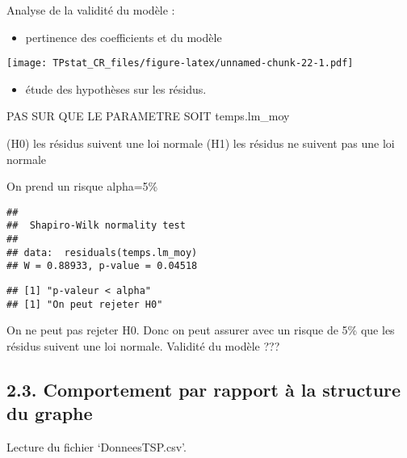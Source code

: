 \documentclass[]{article}
\newenvironment{Shaded}{\begin{snugshade}}{\end{snugshade}}
\newcommand{\KeywordTok}[1]{\textcolor[rgb]{0.13,0.29,0.53}{\textbf{#1}}}
\newcommand{\NormalTok}[1]{#1}
\newcommand{\OperatorTok}[1]{\textcolor[rgb]{0.81,0.36,0.00}{\textbf{#1}}}
\newcommand{\StringTok}[1]{\textcolor[rgb]{0.31,0.60,0.02}{#1}}
\providecommand{\tightlist}{%
  \setlength{\itemsep}{0pt}\setlength{\parskip}{0pt}}
\begin{document}
Analyse de la validité du modèle :

\begin{itemize}
\tightlist
\item
  pertinence des coefficients et du modèle
\end{itemize}

\texttt{[image: TPstat\_CR\_files/figure-latex/unnamed-chunk-22-1.pdf]}

\begin{itemize}
\tightlist
\item
  étude des hypothèses sur les résidus.
\end{itemize}

PAS SUR QUE LE PARAMETRE SOIT temps.lm\_moy

(H0) les résidus suivent une loi normale (H1) les résidus ne suivent pas
une loi normale

On prend un risque alpha=5\%

\begin{verbatim}
## 
##  Shapiro-Wilk normality test
## 
## data:  residuals(temps.lm_moy)
## W = 0.88933, p-value = 0.04518
\end{verbatim}

\begin{verbatim}
## [1] "p-valeur < alpha"
## [1] "On peut rejeter H0"
\end{verbatim}

On ne peut pas rejeter H0. Donc on peut assurer avec un risque de 5\%
que les résidus suivent une loi normale. Validité du modèle ???

\hypertarget{comportement-par-rapport-uxe0-la-structure-du-graphe}{%
\subsection{2.3. Comportement par rapport à la structure du
graphe}\label{comportement-par-rapport-uxe0-la-structure-du-graphe}}

Lecture du fichier `DonneesTSP.csv'.

\begin{Shaded}
\end{Shaded}
\end{document}
